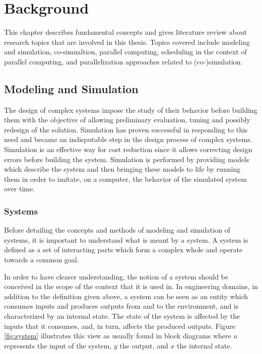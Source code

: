 \chapter{\label{ch:2-bkgnd}Background}

\minitoc

This chapter describes fundamental concepts and gives literature review about research topics that are involved in this thesis. Topics covered include modeling and simulation, co-simualtion, parallel computing, scheduling in the context of parallel computing, and parallelization approaches related to (co-)simulation. 

\section{\label{sec:MnS}Modeling and Simulation}

The design of complex systems impose the study of their behavior before building them with the objective of allowing preliminary evaluation, tuning and possibly redesign of the solution. Simulation has proven successful in responding to this need and became an indisputable step in the design process of complex systems. Simulation is an effective way for cost reduction since it allows correcting design errors before building the system. Simulation is performed by providing models which describe the system and then bringing these models to life by running them in order to imitate, on a computer, the behavior of the simulated system over time.   

\subsection{Systems}

Before detailing the concepts and methods of modeling and simulation of systems, it is important to understand what is meant by a system. A system is defined as a set of interacting parts which form a complex whole and operate towards a common goal. 

In order to have clearer understanding, the notion of a system should be conceived in the scope of the context that it is used in. In engineering domains, in addition to the definition given above, a system can be seen as an entity which consumes inputs and produces outputs from and to the environment, and is characterized by an internal state. The state of the system is affected by the inputs that it consumes, and, in turn, affects the produced outputs. Figure \ref{fig:system} illustrates this view as usually found in block diagrams where $u$ represents the input of the system, $y$ the output, and $x$ the internal state.

